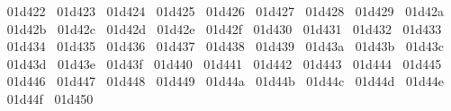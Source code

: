 {  ^^^^^^01d422%
  ^^^^^^01d423%
  ^^^^^^01d424%
  ^^^^^^01d425%
  ^^^^^^01d426%
  ^^^^^^01d427%
  ^^^^^^01d428%
  ^^^^^^01d429%
  ^^^^^^01d42a%
  ^^^^^^01d42b%
  ^^^^^^01d42c%
  ^^^^^^01d42d%
  ^^^^^^01d42e%
  ^^^^^^01d42f%
  ^^^^^^01d430%
  ^^^^^^01d431%
  ^^^^^^01d432%
  ^^^^^^01d433%
  ^^^^^^01d434%
  ^^^^^^01d435%
  ^^^^^^01d436%
  ^^^^^^01d437%
  ^^^^^^01d438%
  ^^^^^^01d439%
  ^^^^^^01d43a%
  ^^^^^^01d43b%
  ^^^^^^01d43c%
  ^^^^^^01d43d%
  ^^^^^^01d43e%
  ^^^^^^01d43f%
  ^^^^^^01d440%
  ^^^^^^01d441%
  ^^^^^^01d442%
  ^^^^^^01d443%
  ^^^^^^01d444%
  ^^^^^^01d445%
  ^^^^^^01d446%
  ^^^^^^01d447%
  ^^^^^^01d448%
  ^^^^^^01d449%
  ^^^^^^01d44a%
  ^^^^^^01d44b%
  ^^^^^^01d44c%
  ^^^^^^01d44d%
  ^^^^^^01d44e%
  ^^^^^^01d44f%
  ^^^^^^01d450%
}
